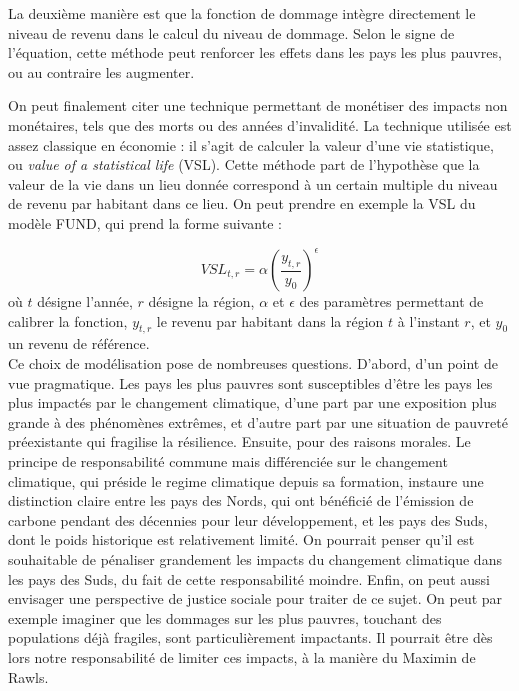 La deuxième manière est que la fonction de dommage intègre directement le niveau de revenu dans le calcul du niveau de dommage. Selon le signe de l'équation, cette méthode peut renforcer les effets dans les pays les plus pauvres, ou au contraire les augmenter. 

On peut finalement citer une technique permettant de monétiser des impacts non monétaires, tels que des morts ou des années d'invalidité. La technique utilisée est assez classique en économie : il s'agit de calculer la valeur d'une vie statistique, ou \emph{value of a statistical life} (VSL). Cette méthode part de l'hypothèse que la valeur de la vie dans un lieu donnée correspond à un certain multiple du niveau de revenu par habitant dans ce lieu. On peut prendre en exemple la VSL du modèle FUND, qui prend la forme suivante : 

\begin{equation}
    VSL_{t, r} = \alpha (\frac{y_{t,r}}{y_0})^\epsilon
\end{equation}
où $t$ désigne l'année, $r$ désigne la région, $\alpha$ et $\epsilon$ des paramètres permettant de calibrer la fonction, $y_{t,r}$ le revenu par habitant dans la région $t$ à l'instant $r$, et $y_0$ un revenu de référence.  \\

Ce choix de modélisation pose de nombreuses questions. 
D'abord, d'un point de vue pragmatique. Les pays les plus pauvres sont susceptibles d'être les pays les plus impactés par le changement climatique, d'une part par une exposition plus grande à des phénomènes extrêmes, et d'autre part par une situation de pauvreté préexistante qui fragilise la résilience. 
Ensuite, pour des raisons morales. Le principe de responsabilité commune mais différenciée sur le changement climatique, qui préside le \gls{regime climatique} depuis sa formation, instaure une distinction claire entre les pays des Nords, qui ont bénéficié de l'émission de carbone pendant des décennies pour leur développement, et les pays des Suds, dont le poids historique est relativement limité. On pourrait penser qu'il est souhaitable de pénaliser grandement les impacts du changement climatique dans les pays des Suds, du fait de cette responsabilité moindre. 
Enfin,  on peut aussi envisager une perspective de justice sociale pour traiter de ce sujet. On peut par exemple imaginer que les dommages sur les plus pauvres, touchant des populations déjà fragiles, sont particulièrement impactants. Il pourrait être dès lors notre responsabilité de limiter ces impacts, à la manière du Maximin de Rawls. \\

